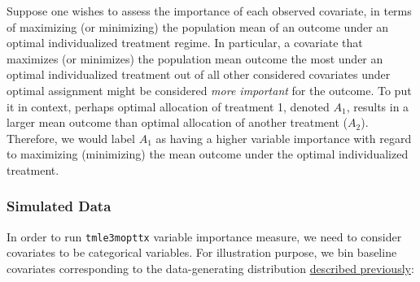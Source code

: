 \documentclass[12pt, krantz2,]{krantz}
\newenvironment{Shaded}{\begin{snugshade}}{\end{snugshade}}
\newcommand{\CommentTok}[1]{\textcolor[rgb]{0.37,0.37,0.37}{\textit{#1}}}
\newcommand{\DataTypeTok}[1]{\textcolor[rgb]{0.27,0.27,0.27}{#1}}
\newcommand{\DecValTok}[1]{\textcolor[rgb]{0.06,0.06,0.06}{#1}}
\newcommand{\KeywordTok}[1]{\textcolor[rgb]{0.27,0.27,0.27}{\textbf{#1}}}
\newcommand{\NormalTok}[1]{#1}
\newcommand{\OperatorTok}[1]{\textcolor[rgb]{0.43,0.43,0.43}{\textbf{#1}}}
\newcommand{\StringTok}[1]{\textcolor[rgb]{0.5,0.5,0.5}{#1}}
\theoremstyle{definition}
\theoremstyle{definition}
\theoremstyle{definition}
\newcommand{\1}{\mathbbm{1}}
\begin{document}
Suppose one wishes to assess the importance of each observed covariate, in
terms of maximizing (or minimizing) the population mean of an outcome under an
optimal individualized treatment regime. In particular, a covariate that
maximizes (or minimizes) the population mean outcome the most under an optimal
individualized treatment out of all other considered covariates under optimal
assignment might be considered \emph{more important} for the outcome. To put it in
context, perhaps optimal allocation of treatment 1, denoted \(A_1\), results in a
larger mean outcome than optimal allocation of another treatment (\(A_2\)).
Therefore, we would label \(A_1\) as having a higher variable importance with
regard to maximizing (minimizing) the mean outcome under the optimal
individualized treatment.

\hypertarget{simulated-data-2}{%
\subsubsection{Simulated Data}\label{simulated-data-2}}

In order to run \texttt{tmle3mopttx} variable importance measure, we need to consider
covariates to be categorical variables. For illustration purpose, we bin
baseline covariates corresponding to the data-generating distribution
\protect\hyperlink{oit-eval}{described previously}:

\begin{Shaded}
\end{Shaded}
\end{document}
